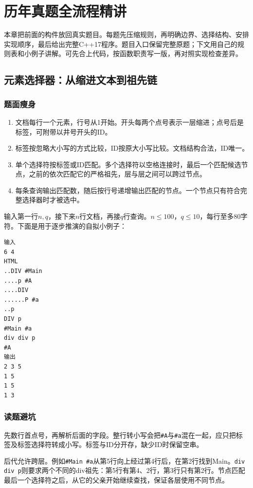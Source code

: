 \section{历年真题全流程精讲}
本章把前面的构件放回真实题目。每题先压缩规则，再明确边界、选择结构、安排实现顺序，最后给出完整C++17程序。题目入口保留完整原题；下文用自己的规则表和小例子讲解。可先合上代码，按函数职责写一版，再对照实现检查差异。

\subsection{元素选择器：从缩进文本到祖先链}
\subsubsection{题面瘦身}
\begin{enumerate}
\item 文档每行一个元素，行号从1开始。开头每两个点号表示一层缩进；点号后是标签，可附带以井号开头的ID。
\item 标签按忽略大小写的方式比较，ID按原大小写比较。文档结构合法，ID唯一。
\item 单个选择符按标签或ID匹配。多个选择符以空格连接时，最后一个匹配候选节点，之前的依次匹配它的严格祖先，层与层之间可以跨过节点。
\item 每条查询输出匹配数，随后按行号递增输出匹配的节点。一个节点只有符合完整选择器时才被选中。
\end{enumerate}
输入第一行$n,q$，接下来$n$行文档，再接$q$行查询。$n\le100$，$q\le10$，每行至多80字符。下面是用于逐步推演的自拟小例子：
\begin{verbatim}
输入
6 4
HTML
..DIV #Main
....p #A
....DIV
......P #a
..p
DIV p
#Main #a
div div p
#A
输出
2 3 5
1 5
1 5
1 3
\end{verbatim}

\subsubsection{读题避坑}
先数行首点号，再解析后面的字段。整行转小写会把\texttt{\#A}与\texttt{\#a}混在一起，应只把标签及标签选择符转成小写。标签与ID分开存，缺少ID时保留空串。

后代允许跨层。例如\texttt{\#Main \#a}从第5行向上经过第4行后，在第2行找到Main。\texttt{div div p}则要求两个不同的div祖先：第5行有第4、2行，第3行只有第2行。节点匹配最后一个选择符之后，从它的父亲开始继续查找，保证各层使用不同节点。

